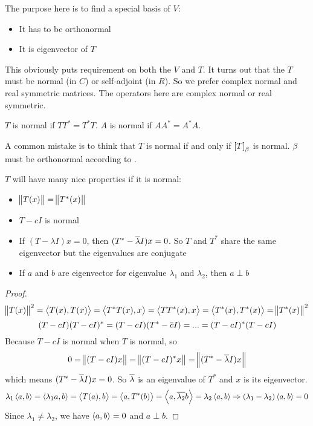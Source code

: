 The purpose here is to find a special basis of $V$:
\begin{itemize}
    \item It has to be orthonormal
    \item It is eigenvector of $T$
\end{itemize}


This obviously puts requirement on both the $V$ and $T$. It turns out that the $T$ must be normal (in $C$) or self-adjoint (in $R$). So we prefer complex normal and real symmetric matrices. The operators here are complex normal or real symmetric.

\begin{definition}[Normal]
    $T$ is normal if $TT^* = T^* T$. $A$ is normal if $AA^* = A^* A$.
\end{definition}

A common mistake is to think that $T$ is normal if and only if $\coordinate{T}_\beta$ is normal. $\beta$ must be orthonormal according to .

$T$ will have many nice properties if it is normal:
\begin{itemize}
    \item $\norm{T(x)} = \norm{T^* (x)}$
    \item $T - cI$ is normal
    \item If $(T - \lambda I)x = 0$, then $(T^* - \overline{\lambda}I)x = 0$. So $T$ and $T^*$ share the same eigenvector but the eigenvalues are conjugate
    \item If $a$ and $b$ are eigenvector for eigenvalue $\lambda_1$ and $\lambda_2$, then $a \perp b$
\end{itemize}
\begin{proof}
    \begin{equation*}
        \norm{T(x)}^2 = \left\langle \displaystyle T(x), T(x) \right\rangle = \left\langle \displaystyle T^*T(x), x \right\rangle = \left\langle \displaystyle TT^*(x), x \right\rangle = \left\langle \displaystyle T^*(x), T^*(x) \right\rangle = \norm{T^*(x)}^2
    \end{equation*}
    \begin{equation*}
        (T-cI)(T-cI)^* = (T-cI)(T^* - \overline{c}I) = ... = (T-cI)^*(T-cI)
    \end{equation*}
    Because $T-cI$ is normal when $T$ is normal, so
    \begin{equation*}
        0 = \norm{(T-cI)x} = \norm{(T-cI)^* x} =  \norm{(T^*- \overline{\lambda} I)x}
    \end{equation*}
    which means $(T^*- \overline{\lambda} I)x = 0$. So $\overline{\lambda}$ is an eigenvalue of $T^*$ and $x$ is its eigenvector.
    \begin{equation*}
        \lambda_1 \left\langle \displaystyle a, b \right\rangle = \left\langle \displaystyle \lambda_1 a, b \right\rangle = \left\langle \displaystyle T(a), b \right\rangle = \left\langle \displaystyle a, T^*(b) \right\rangle = \left\langle \displaystyle a, \overline{\lambda_2}b \right\rangle = \lambda_2 \left\langle \displaystyle a, b \right\rangle \Rightarrow (\lambda_1 - \lambda_2)\left\langle \displaystyle a, b \right\rangle = 0
    \end{equation*}
    Since $\lambda_1 \neq \lambda_2$, we have $\left\langle \displaystyle a, b \right\rangle = 0$ and $a \perp b$.
\end{proof}



